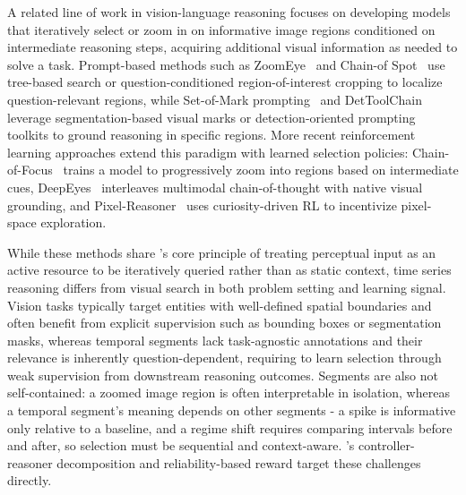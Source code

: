 A related line of work in vision-language reasoning focuses on developing models that iteratively select or zoom in on informative image regions conditioned on intermediate reasoning steps, acquiring additional visual information as needed to solve a task. Prompt-based methods such as ZoomEye~\cite{shen2025zoomeyeenhancingmultimodalllms} and Chain-of Spot~\cite{liu2024chainofspotinteractivereasoningimproves} use tree-based search or question-conditioned region-of-interest cropping to localize question-relevant regions, while Set-of-Mark prompting~\cite{yang2023setofmarkpromptingunleashesextraordinary} and DetToolChain~\cite{wu2024dettoolchainnewpromptingparadigm} leverage segmentation-based visual marks or detection-oriented prompting toolkits to ground reasoning in specific regions. More recent reinforcement learning approaches extend this paradigm with learned selection policies: Chain-of-Focus~\cite{zhang2025chain} trains a model to progressively zoom into regions based on intermediate cues, DeepEyes~\cite{zheng2026deepeyesincentivizingthinkingimages} interleaves multimodal chain-of-thought with native visual grounding, and Pixel-Reasoner~\cite{wang2025pixel} uses curiosity-driven RL to incentivize pixel-space exploration.

While these methods share \algoname's core principle of treating perceptual input as an active resource to be iteratively queried rather than as static context, time series reasoning differs from visual search in both problem setting and learning signal. Vision tasks typically target entities with well-defined spatial boundaries and often benefit from explicit supervision such as bounding boxes or segmentation masks, whereas temporal segments lack task-agnostic annotations and their relevance is inherently question-dependent, requiring \algoname to learn selection through weak supervision from downstream reasoning outcomes. Segments are also not self-contained: a zoomed image region is often interpretable in isolation, whereas a temporal segment's meaning depends on other segments - a spike is informative only relative to a baseline, and a regime shift requires comparing intervals before and after, so selection must be sequential and context-aware. \algoname's controller-reasoner decomposition and reliability-based reward target these challenges directly.


